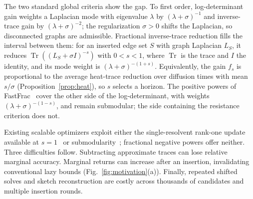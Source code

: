 \documentclass[conference]{IEEEtran}
\theoremstyle{definition}
\DeclareMathOperator{\Tr}{Tr}
\begin{document}
The two standard global criteria show the gap. To first order,
log-determinant gain weights a Laplacian mode with eigenvalue
$\lambda$ by $(\lambda+\sigma)^{-1}$ and inverse-trace gain by
$(\lambda+\sigma)^{-2}$; the regularization $\sigma>0$ shifts the
Laplacian, so disconnected graphs are admissible. Fractional
inverse-trace reduction fills the interval between them: for an
inserted edge set $S$ with graph Laplacian $L_S$, it reduces
$\Tr((L_S+\sigma I)^{-s})$ with $0<s<1$, where $\Tr$ is the trace and
$I$ the identity, and its mode weight is $(\lambda+\sigma)^{-(1+s)}$.
Equivalently, the gain $f_s$ is proportional to the average heat-trace
reduction over diffusion times with mean $s/\sigma$
(Proposition~\ref{prop:heat}), so $s$ selects a horizon. The positive
powers of FastFrac~\cite{fastfrac} cover the other side of the
log-determinant, with weights $(\lambda+\sigma)^{-(1-s)}$, and remain
submodular; the side containing the resistance criterion does not.

Existing scalable optimizers exploit either the single-resolvent
rank-one update available at $s=1$~\cite{predari2023} or
submodularity~\cite{leskovec2007,fastfrac}; fractional negative
powers offer neither. Three difficulties follow. Subtracting
approximate traces can lose relative marginal accuracy. Marginal
returns can increase after an insertion,
invalidating conventional lazy bounds (Fig.~\ref{fig:motivation}(a)).
Finally, repeated shifted solves and sketch reconstruction are costly
across thousands of candidates and multiple insertion rounds.
\end{document}

